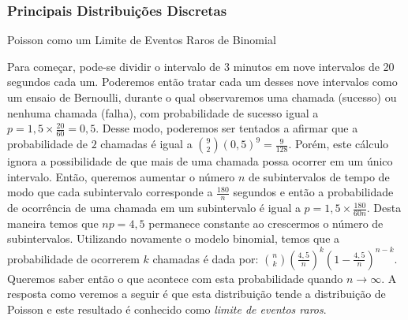 \begin{frame}
\frametitle{\textbf{Principais Distribuições Discretas}}
\baselineskip=13pt
\begin{block}{Poisson como um Limite de Eventos Raros de Binomial}


Para começar, pode-se dividir o intervalo de 3 minutos em nove
intervalos de 20 segundos cada um. Poderemos então tratar cada um
desses nove intervalos como um ensaio de Bernoulli, durante o qual
observaremos uma chamada (sucesso) ou nenhuma chamada (falha), com
probabilidade de sucesso igual a $p=1,5\times \frac{20}{60}=0,5$.
Desse modo, poderemos ser tentados a afirmar que a probabilidade de
$2$ chamadas é igual a $\binom{9}{2}(0,5)^9=\frac{9}{128}$. Porém,
este cálculo ignora a possibilidade de que mais de uma chamada possa
ocorrer em um único intervalo. Então, queremos aumentar o número $n$
de subintervalos de tempo de modo que cada subintervalo corresponde
a $\frac{180}{n}$ segundos e então a probabilidade de ocorrência de
uma chamada em um subintervalo é igual a $p=1,5\times
\frac{180}{60n}$. Desta maneira temos que $np=4,5$ permanece
constante ao crescermos o número de subintervalos. Utilizando
novamente o modelo binomial, temos que a probabilidade de ocorrerem
$k$ chamadas é dada por:
$\binom{n}{k}(\frac{4,5}{n})^k(1-\frac{4,5}{n})^{n-k}$. Queremos
saber então o que acontece com esta probabilidade quando
$n\rightarrow\infty$. A resposta como veremos a seguir é que esta
distribuição tende a distribuição de Poisson e este resultado é
conhecido como {\em limite de eventos raros}.

\end{block}
\end{frame}

